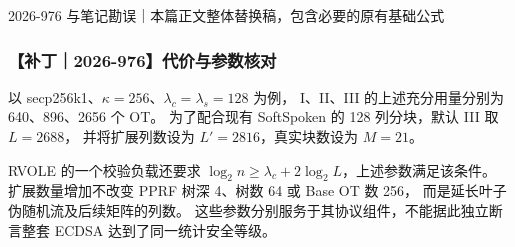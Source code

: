 \begin{patchnote}{2026-976 与笔记勘误｜本篇正文整体替换稿，包含必要的原有基础公式}
\subsubsection{【补丁｜2026-976】代价与参数核对}

以 secp256k1、$\kappa=256$、$\lambda_c=\lambda_s=128$ 为例，
I、II、III 的上述充分用量分别为 640、896、2656 个 OT。
为了配合现有 SoftSpoken 的 128 列分块，默认 III 取 $L=2688$，
并将扩展列数设为 $L'=2816$，真实块数设为 $M=21$。

RVOLE 的一个校验负载还要求 $\log_2 n\ge\lambda_c+2\log_2L$，上述参数满足该条件。
扩展数量增加不改变 PPRF 树深 4、树数 64 或 Base OT 数 256，
而是延长叶子伪随机流及后续矩阵的列数。
这些参数分别服务于其协议组件，不能据此独立断言整套 ECDSA 达到了同一统计安全等级。
\end{patchnote}
